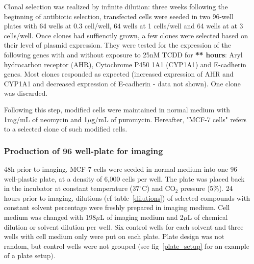 Clonal selection was realized by infinite dilution: three weeks following the beginning of antibiotic selection, transfected cells were seeded in two 96-well plates with 64 wells at 0.3 cell/well, 64 wells at 1 cells/well and 64 wells at at 3 cells/well. Once clones had suffienctly grown, a few clones were selected based on their level of plasmid expression. They were tested for the expression of the following genes with and without exposure to 25nM TCDD for \textbf{** hours}: Aryl hydrocarbon receptor  (AHR), Cytochrome P450 1A1 (CYP1A1) and E-cadherin genes. Most clones responded as expected (increased expression of AHR and CYP1A1 and decreased expression of E-cadherin - data not shown). One clone was discarded.

Following this step, modified cells were maintained in normal medium with 1mg/mL of neomycin and 1$\mu$g/mL of puromycin. Hereafter, "MCF-7 cells" refers to a selected clone of such modified cells.


\subsubsection{Production of 96 well-plate for imaging}
48h prior to imaging, MCF-7 cells were seeded in normal medium into one 96 well-plastic plate, at a density of 6,000 cells per well. The plate was placed back in the incubator at constant temperature ($37^\circ$C) and CO$_2$ pressure (5\%). 24 hours prior to imaging, dilutions (cf table~\ref{dilutions}) of selected compounds with constant solvent percentage were freshly prepared in imaging medium. Cell medium was changed with 198$\mu$L of imaging medium and 2$\mu$L of chemical dilution or solvent dilution per well. Six control wells for each solvent and three wells with cell medium only were put on each plate. Plate design was not random, but control wells were not grouped (see fig~\ref{plate_setup} for an example of a plate setup).

